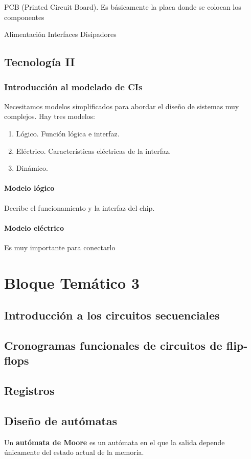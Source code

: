 \documentclass[a4paper]{book}
\begin{document}
PCB (Printed Circuit Board). Es básicamente la placa donde se colocan los componentes

Alimentación
Interfaces
Disipadores

\section{Tecnología II}
\subsection{Introducción al modelado de CIs}
Necesitamos modelos simplificados para abordar el diseño de sistemas muy complejos.
Hay tres modelos:
\begin{enumerate}
	\item Lógico. Función lógica e interfaz.
	\item Eléctrico. Características eléctricas de la interfaz.
	\item Dinámico.
\end{enumerate}
\subsubsection{Modelo lógico}
Decribe el funcionamiento y la interfaz del chip.
\subsubsection{Modelo eléctrico}
Es muy importante para conectarlo

\chapter{Bloque Temático 3}


\section{Introducción a los circuitos secuenciales}
\section{Cronogramas funcionales de circuitos de flip-flops}
\section{Registros}
\section{Diseño de autómatas}
Un \textbf{autómata de Moore} es un autómata en el que la salida depende únicamente del estado actual de la memoria.
\end{document}
